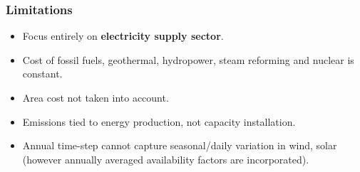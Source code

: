 \begin{frame}
  \frametitle{Limitations}
        \begin{itemize}
        
         \item Focus entirely on \textbf{electricity supply sector}.      
         
         \item Cost of fossil fuels, geothermal, hydropower, steam reforming and nuclear is constant.
         
         \item Area cost not taken into account.
         
         \item Emissions tied to energy production, not capacity installation.
         
         \item Annual time-step cannot capture seasonal/daily variation in wind, solar (however annually averaged availability factors are incorporated).
        
        \end{itemize}

\end{frame}
